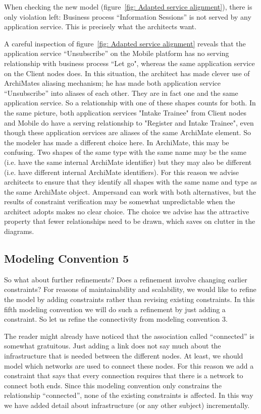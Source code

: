 \documentclass[sn-vancouver]{sn-jnl}%
\theoremstyle{thmstyleone}%
\theoremstyle{thmstyletwo}%
\theoremstyle{thmstylethree}%
\begin{document}
When checking the new model (figure~\ref{fig: Adapted service alignment}), there is only violation left:
Business process ``Information Sessions'' is not served by any application service.
This is precisely what the architects want.

A careful inspection of figure~\ref{fig: Adapted service alignment} reveals that
the application service ``Unsubscribe'' on the Mobile platform has no serving relationship with business process ``Let go",
whereas the same application service on the Client nodes does.
In this situation, the architect has made clever use of ArchiMates aliasing mechanism;
he has made both application service ``Unsubscribe'' into aliases of each other.
They are in fact one and the same application service.
So a relationship with one of these shapes counts for both.
In the same picture, both application services "Intake Trainee" from Client nodes and Mobile do have a serving relationship to "Register and Intake Trainee",
even though these application services are aliases of the same ArchiMate element.
So the modeler has made a different choice here.
In ArchiMate, this may be confusing.
Two shapes of the same type with the same name may be the same (i.e. have the same internal ArchiMate identifier)
but they may also be different (i.e. have different internal ArchiMate identifiers).
For this reason we advise architects to ensure that they identify all shapes with the same name and type as the same ArchiMate object.
Ampersand can work with both alternatives, but the results of constraint verification may be somewhat unpredictable when the architect
adopts makes no clear choice.
The choice we advise has the attractive property that fewer relationships need to be drawn, which saves on clutter in the diagrams.

\subsection{Modeling Convention 5}
So what about further refinements? Does a refinement involve changing earlier constraints?
For reasons of maintainability and scalability, we would like to refine the model by adding constraints rather than revising existing constraints.
In this fifth modeling convention we will do such a refinement by just adding a constraint.
So let us refine the connectivity from modeling convention 3.

The reader might already have noticed that the association called ``connected'' is somewhat gratuitous.
Just adding a link does not say much about the infrastructure that is needed between the different nodes.
At least, we should model which networks are used to connect these nodes.
For this reason we add a constraint that says that every connection requires that there is a network to connect both ends.
Since this modeling convention only constrains the relationship ``connected'',
none of the existing constraints is affected.
In this way we have added detail about infrastructure (or any other subject) incrementally.
\end{document}
